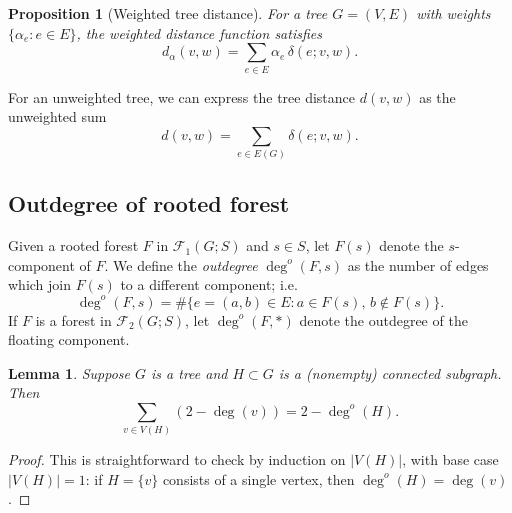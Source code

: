 \documentclass{amsart}
\newtheorem{prop}[thm]{Proposition}
\newtheorem{lem}[thm]{Lemma}
\theoremstyle{definition}
\newcommand{\forests}{\mathcal{F}}
\newcommand{\degout}{\deg^o}
\begin{document}
\begin{prop}[Weighted tree distance]
\label{prop:distance-sum}
For a tree $G = (V,E)$ with weights $\{\alpha_e : e \in E\}$,
the weighted distance function satisfies
\[ d_\alpha(v,w) = \sum_{e \in E} \alpha_e \, \delta(e; v,w) .\]
\end{prop}

For an unweighted tree, we can express the tree distance $d(v,w)$ as the unweighted sum
\begin{equation*}
d(v,w) = \sum_{e \in E(G)} \delta(e; v,w).
\end{equation*}


\subsection{Outdegree of rooted forest}

Given a rooted forest $F$ in $\forests_1(G;S)$ and $s \in S$,
let $F(s)$ denote the $s$-component of $F$.
We define the {\em outdegree} $\degout(F,s)$ as the number of edges which join $F(s)$ to a different component; i.e.
\begin{equation}
\label{eq:outdeg}
	\degout(F,s) = \#\{ e = (a,b) \in E : a \in F(s),\, b \not\in F(s)\}.
\end{equation}
If $F$ is a forest in $\forests_2(G;S)$, let $\degout(F,*)$ denote the outdegree of the floating component.

\begin{lem}
\label{lem:outdeg-sum}
Suppose $G$ is a tree and $H\subset G$ is a (nonempty) connected subgraph.
Then
\[
  \sum_{v \in V(H)} \left( 2 -  \deg(v) \right) = 2 - \degout(H) .
\]
\end{lem}
\begin{proof}
This is straightforward to check by induction on $|V(H)|$,
with base case $|V(H)| = 1$:
if $H = \{v\}$ consists of a single vertex, then $\degout(H) = \deg(v)$.
%
\end{proof}
\end{document}
